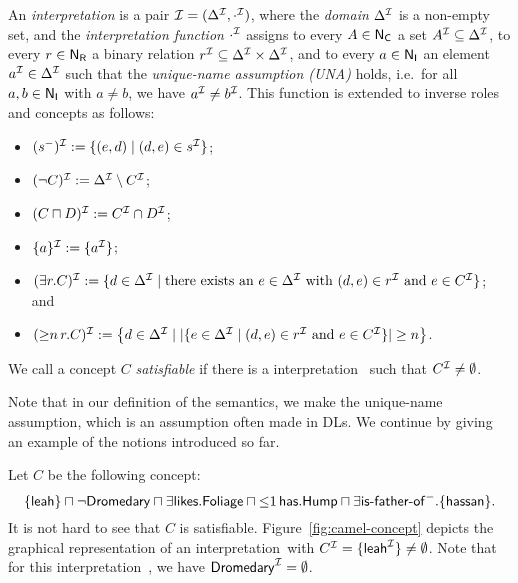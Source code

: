 \begin{definition}\label{def:semantics-concepts}
    An \emph{interpretation} is a pair $\mathcal{I}=(\Delta^\mathcal{I},\cdot^\mathcal{I})$, where the
    \emph{domain} $\Delta^\mathcal{I}$ is a non-empty set, and the \emph{interpretation
    function} $\cdot^\mathcal{I}$ assigns to every $A\in\mathsf{N_C}$ a set
    $A^\mathcal{I}\subseteq\Delta^\mathcal{I}$, to every $r\in\mathsf{N_R}$ a binary relation
    $r^\mathcal{I}\subseteq\Delta^\mathcal{I}\times\Delta^\mathcal{I}$, and to every $a\in\mathsf{N_I}$ an
    element $a^\mathcal{I}\in\Delta^\mathcal{I}$ such that the \emph{unique-name assumption
    (UNA)} holds, i.e.~for all $a,b\in\mathsf{N_I}$ with $a\ne b$, we have
    $a^\mathcal{I}\ne b^\mathcal{I}$.  This function is extended to inverse roles and concepts
    as follows:
    \begin{itemize}
        \item $(s^-)^\mathcal{I}:=\{(e,d)\mid(d,e)\in s^\mathcal{I}\}$;
        \item $(\lnot C)^\mathcal{I}:=\Delta^\mathcal{I}\setminus C^\mathcal{I}$;
        \item $(C\sqcap D)^\mathcal{I}:=C^\mathcal{I}\cap D^\mathcal{I}$;
        \item $\{a\}^\mathcal{I}:=\{a^\mathcal{I}\}$;
        \item $(\exists r.C)^\mathcal{I}:=\{d\in\Delta^\mathcal{I}\mid\text{there exists an
            $e\in\Delta^\mathcal{I}$ with $(d,e)\in r^\mathcal{I}$ and $e\in C^\mathcal{I}$}\}$; and
        \item
            $({\ge}n\,r.C)^\mathcal{I}:=\bigl\{d\in\Delta^\mathcal{I}\mid\lvert\{e\in\Delta^\mathcal{I}\mid(d,e)\in
            r^\mathcal{I}\text{ and }e\in C^\mathcal{I}\}\rvert\ge n\bigr\}$.
    \end{itemize}
    We call a concept $C$ \emph{satisfiable} if there is a interpretation~\Imc
    such that $C^\mathcal{I}\ne\emptyset$.
\end{definition}

\noindent
Note that in our definition of the semantics, we make the unique-name
assumption, which is an assumption often made in DLs.
%
We continue by giving an example of the notions introduced so far.

\begin{example}\label{ex:camel-concept}
    Let $C$ be the following concept:
    \[\{\leah\}\sqcap\lnot\Dromedary\sqcap\exists\likes.\Foliage\sqcap%
        \atMost{1}{\has}{\Hump}\sqcap\exists\isFatherOf^-.\{\hassan\}.\]
    It is not hard to see that $C$ is satisfiable.
    Figure~\ref{fig:camel-concept} depicts the graphical representation of an
    interpretation~\Imc with $C^\mathcal{I}=\{\mathsf{leah}^\mathcal{I}\}\ne\emptyset$.  Note
    that for this interpretation~\Imc, we have $\mathsf{Dromedary}^\mathcal{I}=\emptyset$.
\end{example}

